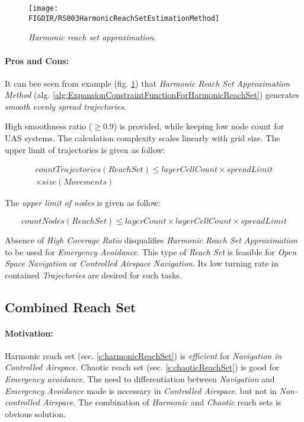 \begin{figure}[H]
    \centering
    \texttt{[image: \\FIGDIR/RS003HarmonicReachSetEstimationMethod]} 
    \caption{\emph{Harmonic \emph{reach set} approximation}.}
    \label{fig:harmonicReachSetApproximation}
\end{figure}

\paragraph{Pros and Cons:} It can bee seen from example (fig. \ref{fig:harmonicReachSetApproximation}) that \emph{Harmonic Reach Set Approximation Method} (alg. \ref{alg:ExpansionConstraintFunctionForHarmonicReachSet}) generates \emph{smooth evenly spread trajectories}.
    
High smoothness ratio ($\ge 0.9$) is provided, while keeping low node count for UAS systems. The calculation complexity scales linearly with grid size. The upper limit of trajectories is given as follow:

\begin{multline}
    countTrajectories(ReachSet) \le layerCellCount \times spreadLimit \\\times size(Movements)
\end{multline}

\noindent The \emph{upper limit of nodes} is given as follow:

\begin{equation}
    countNodes(ReachSet) \le layerCount \times layerCellCount \times spreadLimit
\end{equation}

\noindent Absence of \emph{High Coverage Ratio} disqualifies \emph{Harmonic Reach Set Approximation} to be used for \emph{Emergency Avoidance}. This type of \emph{Reach Set} is feasible for \emph{Open Space Navigation} or \emph{Controlled Airspace Navigation}. Its low turning rate in contained \emph{Trajectories} are desired for such tasks. 



\subsection{Combined Reach Set}\label{s:combinedReachSet}
\paragraph{Motivation:} Harmonic reach set (sec. \ref{s:harmonicReachSet}) is \emph{efficient} for \emph{Navigation in \emph{Controlled Airspace}}. Chaotic reach set (sec. \ref{s:chaoticReachSet}) is good for \emph{Emergency avoidance}. The need to differentiation between \emph{Navigation} and \emph{Emergency Avoidance} mode is necessary in \emph{Controlled Airspace}. but not in \emph{Non-controlled Airspace}. The combination of \emph{Harmonic} and \emph{Chaotic} reach sets is obvious solution. 


